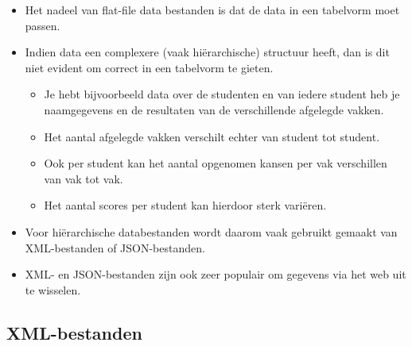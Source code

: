 \documentclass[]{memoir}
\providecommand{\tightlist}{%
  \setlength{\itemsep}{0pt}\setlength{\parskip}{0pt}}
\begin{document}
\begin{itemize}
\tightlist
\item
  Het nadeel van flat-file data bestanden is dat de data in een tabelvorm moet passen.
\item
  Indien data een complexere (vaak hiërarchische) structuur heeft, dan is dit niet evident om correct in een tabelvorm te gieten.

  \begin{itemize}
  \tightlist
  \item
    Je hebt bijvoorbeeld data over de studenten en van iedere student heb je naamgegevens en de resultaten van de verschillende afgelegde vakken.
  \item
    Het aantal afgelegde vakken verschilt echter van student tot student.
  \item
    Ook per student kan het aantal opgenomen kansen per vak verschillen van vak tot vak.
  \item
    Het aantal scores per student kan hierdoor sterk variëren.
  \end{itemize}
\item
  Voor hiërarchische databestanden wordt daarom vaak gebruikt gemaakt van XML-bestanden of JSON-bestanden.
\item
  XML- en JSON-bestanden zijn ook zeer populair om gegevens via het web uit te wisselen.
\end{itemize}

\hypertarget{xml-bestanden-1}{%
\subsection{XML-bestanden}\label{xml-bestanden-1}}
\end{document}
